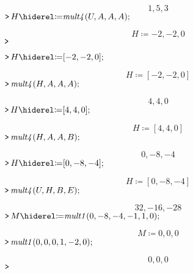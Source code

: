 \documentclass{article}
\begin{document}
\begin{dmath}\label{(7)}
1,5,3
\end{dmath}
\mapleinput
{$ \displaystyle \texttt{>\,} H \coloneqq \mathit{mult4} (U ,A ,A ,A); $}

\begin{dmath}\label{(8)}
H \coloneqq -2,-2,0
\end{dmath}
\mapleinput
{$ \displaystyle \texttt{>\,}  $}

\mapleinput
{$ \displaystyle \texttt{>\,} H \coloneqq [-2,-2,0]; $}

\begin{dmath}\label{(9)}
H \coloneqq \left[-2,-2,0\right]
\end{dmath}
\mapleinput
{$ \displaystyle \texttt{>\,} \mathit{mult4} (H ,A ,A ,A); $}

\begin{dmath}\label{(10)}
4,4,0
\end{dmath}
\mapleinput
{$ \displaystyle \texttt{>\,} H \coloneqq [4,4,0]; $}

\begin{dmath}\label{(11)}
H \coloneqq \left[4,4,0\right]
\end{dmath}
\mapleinput
{$ \displaystyle \texttt{>\,} \mathit{mult4} (H ,A ,A ,B); $}

\begin{dmath}\label{(12)}
0,-8,-4
\end{dmath}
\mapleinput
{$ \displaystyle \texttt{>\,} H \coloneqq [0,-8,-4]; $}

\begin{dmath}\label{(13)}
H \coloneqq \left[0,-8,-4\right]
\end{dmath}
\mapleinput
{$ \displaystyle \texttt{>\,} \mathit{mult4} (U ,H ,B ,E); $}

\begin{dmath}\label{(14)}
32,-16,-28
\end{dmath}
\mapleinput
{$ \displaystyle \texttt{>\,} M \coloneqq \mathit{mult1} (0,-8,-4,-1,1,0); $}

\begin{dmath}\label{(15)}
M \coloneqq 0,0,0
\end{dmath}
\mapleinput
{$ \displaystyle \texttt{>\,} \mathit{mult1} (0,0,0,1,-2,0); $}

\begin{dmath}\label{(16)}
0,0,0
\end{dmath}
\mapleinput
{$ \displaystyle \texttt{>\,} \, $}
\end{document}
